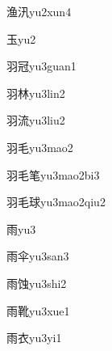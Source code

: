 \begin{verbete}[11;6]{渔汛}{yu2xun4}
\end{verbete}

\begin{verbete}[5]{玉}{yu2}
\end{verbete}

\begin{verbete}[6;9]{羽冠}{yu3guan1}
\end{verbete}

\begin{verbete}[6;8]{羽林}{yu3lin2}
\end{verbete}

\begin{verbete}[6;10]{羽流}{yu3liu2}
\end{verbete}

\begin{verbete}[6;4]{羽毛}{yu3mao2}
\end{verbete}

\begin{verbete}[6;4;10]{羽毛笔}{yu3mao2bi3}
\end{verbete}

\begin{verbete}[6;4;11]{羽毛球}{yu3mao2qiu2}
\end{verbete}

\begin{verbete}[8]{雨}{yu3}
\end{verbete}

\begin{verbete}[8;6]{雨伞}{yu3san3}
\end{verbete}

\begin{verbete}[8;9]{雨蚀}{yu3shi2}
\end{verbete}

\begin{verbete}[8;13]{雨靴}{yu3xue1}
\end{verbete}

\begin{verbete}[8;6]{雨衣}{yu3yi1}
\end{verbete}

